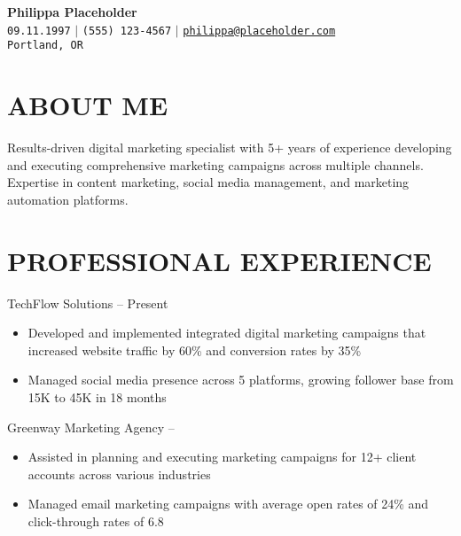 \documentclass{resumeclass}
\begin{document}
\begin{center}
    \textbf{\Huge Philippa Placeholder} \\ \vspace{5pt}
    \small
    {\color{icon-color}\faUser} \hspace{2pt} \texttt{09.11.1997}
    \hspace{1pt} $|$ \hspace{1pt}
    {\color{icon-color}\faPhone*} \texttt{(555) 123-4567}
    \hspace{1pt} $|$ \hspace{1pt}
    {\color{icon-color}\faEnvelope} \hspace{2pt} \href{mailto:philippa@placeholder.com}{\texttt{philippa@placeholder.com}}
    \\ \vspace{4pt}
    {\color{icon-color}\faMapMarker*} \hspace{2pt} \texttt{Portland, OR}
\end{center}

\section{ABOUT ME}

Results-driven digital marketing specialist with 5+ years of experience 
developing and executing comprehensive marketing campaigns across multiple 
channels. Expertise in content marketing, social media management, and marketing 
automation platforms.

\section{PROFESSIONAL EXPERIENCE}

    {TechFlow Solutions}
    { -- Present}
    {
        \begin{itemize}
            \item Developed and implemented integrated digital marketing campaigns that increased website traffic by 60\% and conversion rates by 35\%
            \item Managed social media presence across 5 platforms, growing follower base from 15K to 45K in 18 months
        \end{itemize}
    }

    {Greenway Marketing Agency}
    { -- }
    {
        \begin{itemize}
            \item Assisted in planning and executing marketing campaigns for 12+ client accounts across various industries
            \item Managed email marketing campaigns with average open rates of 24\% and click-through rates of 6.8%
        \end{itemize}
    }
\end{document}
